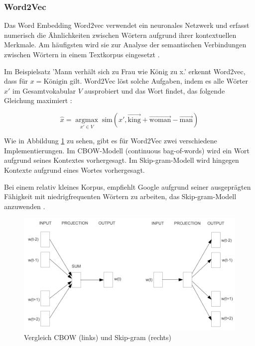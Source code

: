 \subsubsection{Word2Vec}
\label{sec:word2vec}

Das Word Embedding Word2vec verwendet ein neuronales Netzwerk und erfasst numerisch die Ähnlichkeiten zwischen Wörtern aufgrund ihrer 
kontextuellen Merkmale. Am häufigsten wird sie zur Analyse der semantischen Verbindungen zwischen Wörtern in einem Textkorpus 
eingesetzt \cite{schumacher2024word2vec}.

Im Beispielsatz 'Mann verhält sich zu Frau wie König zu x.' erkennt Word2vec, dass für $x = \text{Königin}$ gilt. 
Word2Vec löst solche Aufgaben, indem es alle Wörter $x'$ im Gesamtvokabular $V$ ausprobiert 
und das Wort findet, das folgende Gleichung maximiert \cite{CHURCH_2017}:

\begin{equation}
    \hat{x} = \underset{x' \in V}{\operatorname{argmax}} \; \text{sim}(x', \vec{\text{king}} + \vec{\text{woman}} - \vec{\text{man}})
\end{equation}

Wie in Abbildung \ref{fig:cbow_skipgram} zu sehen, gibt es für Word2Vec zwei verschiedene Implementierungen.
Im CBOW-Modell (continuous bag-of-words) wird ein Wort aufgrund seines Kontextes vorhergesagt.
Im Skip-gram-Modell wird hingegen Kontexte aufgrund eines Wortes vorhergesagt.

Bei einem relativ kleines Korpus, empfiehlt Google aufgrund seiner ausgeprägten Fähigkeit mit niedrigfrequenten Wörtern zu arbeiten, 
das Skip-gram-Modell anzuwenden \cite{schumacher2024word2vec}.

\begin{figure}[htbp]
    \begin{center}
        \includegraphics[scale=0.6]{static/cbow_skipgram.png}
        \caption{\label{fig:cbow_skipgram} Vergleich CBOW (links) und Skip-gram (rechts) \cite{mikolov2013}}
    \end{center}
\end{figure}

